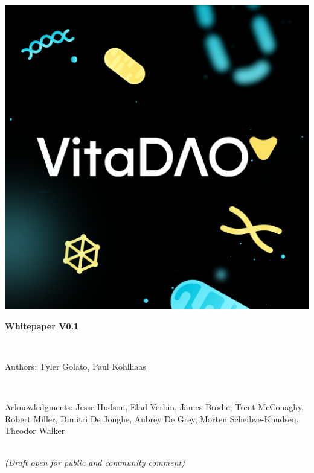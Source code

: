 \documentclass[12pt,letterpaper]{article}
\begin{document}
\begin{titlepage}
\centering
\includegraphics[width=\linewidth]{images/VitaDAO Opengraph.png} 
\\
\vspace{36pt}
{\begin{Large} \textbf{Whitepaper V0.1}\end{Large}}
\\
\vspace{18pt}
{\begin{large}{Authors: Tyler Golato, Paul Kohlhaas}\end{large}}
\\
\vspace{18pt}
{\begin{small}{Acknowledgments:  Jesse Hudson, Elad Verbin, James Brodie, Trent McConaghy, Robert Miller, Dimitri De Jonghe, Aubrey De Grey, Morten Scheibye-Knudsen, Theodor Walker}\end{small}}
\\
\vspace{18pt}
{\small\emph{(Draft open for public and community comment)}}
\end{titlepage}

\newpage

\end{document}
